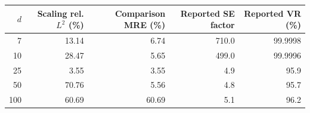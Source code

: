 \begin{tabular}{r r r r r}
\toprule
$d$ & Scaling rel. $L^2$ (\%) & Comparison MRE (\%) & Reported SE factor & Reported VR (\%) \\
\midrule
7 & 13.14 & 6.74 & 710.0 & 99.9998 \\
10 & 28.47 & 5.65 & 499.0 & 99.9996 \\
25 & 3.55 & 3.55 & 4.9 & 95.9 \\
50 & 70.76 & 5.56 & 4.8 & 95.7 \\
100 & 60.69 & 60.69 & 5.1 & 96.2 \\
\bottomrule
\end{tabular}
